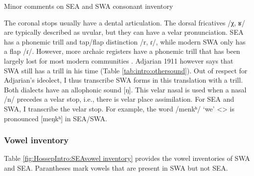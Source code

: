 \begin{exe}
	\ex Minor comments on SEA and SWA consonant inventory\label{list:HossepIntro:seaConsList}
	\begin{xlist}
		\ex The coronal stops usually have a dental articulation. 
		\ex The dorsal fricatives /χ, ʁ/ are typically described as uvular, but they can have a velar pronunciation. 
		\ex SEA has a phonemic trill and tap/flap distinction /r, ɾ/, while modern SWA only has a flap /ɾ/. However, more archaic registers have a phonemic trill that has been largely lost for most modern communities \citep{Tahtadjian-2020-WesterArmenianRhoticDifferentialPhoneticStudy}. Adjarian 1911 however says that SWA still has a trill in his time (Table \ref{tab:intro:othersound}).  Out of respect for Adjarian's ideolect, I thus transcribe SWA forms in this translation with a trill. 
		\ex Both dialects   have an allophonic sound [ŋ]. This velar nasal is used when a nasal /n/ precedes a velar stop, i.e., there is velar place assimilation. For SEA and SWA, I transcribe the velar stop. For example, the word /menkʰ/ `we' <> is pronounced [meŋkʰ] in SEA/SWA.  
		
	\end{xlist}
\end{exe}

\subsubsection{Vowel inventory}\label{sec:HossepIntro:phonotransc:modern:vowe}
Table \ref{fig:HossepIntro:SEAvowel inventory} provides the vowel inventories of SWA and SEA. Parantheses mark vowels that are present in SWA but not SEA. 

